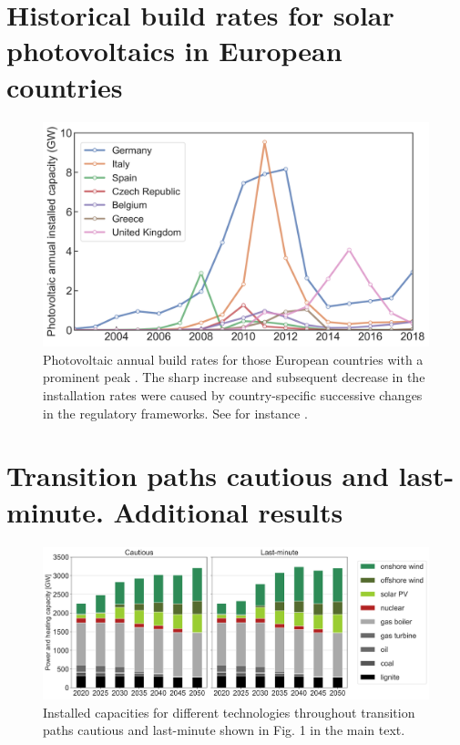 \documentclass[3p]{elsarticle} %
\begin{document}
\section{Historical build rates for solar photovoltaics in European countries}

\begin{figure}[!h]
\centering
\includegraphics[width=12cm]{figures/installation_rates_PV.png}
\caption{Photovoltaic annual build rates for those European countries with a prominent peak \cite{IRENA_2019}. The sharp increase and subsequent decrease in the installation rates were caused by country-specific successive changes in the regulatory frameworks. See for instance \cite{Report_Fraunhofer_2019, Victoria_2012}. } \label{fig_installation_rates_PV} 
\end{figure}
 


\section{Transition paths cautious and last-minute. Additional results}

\begin{figure}[!h]
	\centering
	\includegraphics[width=12cm]{figures/installed_capacity_Base.png}
	\caption{Installed capacities for different technologies throughout transition paths cautious and last-minute shown in Fig. 1 in the main text.} \label{fig_installed_capacity} 
\end{figure}
\end{document}
